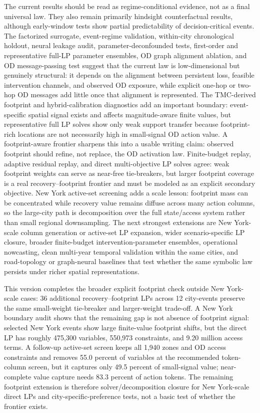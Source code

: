 The current results should be read as regime-conditional evidence, not as a final universal law. They also remain primarily hindsight counterfactual results, although early-window tests show partial predictability of decision-critical events. The factorized surrogate, event-regime validation, within-city chronological holdout, neural leakage audit, parameter-deconfounded tests, first-order and representative full-LP parameter ensembles, OD graph alignment ablation, and OD message-passing test suggest that the current law is low-dimensional but genuinely structural: it depends on the alignment between persistent loss, feasible intervention channels, and observed OD exposure, while explicit one-hop or two-hop OD messages add little once that alignment is represented. The TMC-derived footprint and hybrid-calibration diagnostics add an important boundary: event-specific spatial signal exists and affects magnitude-aware finite values, but representative full LP solves show only weak support transfer because footprint-rich locations are not necessarily high in small-signal OD action value. A footprint-aware frontier sharpens this into a usable writing claim: observed footprint should refine, not replace, the OD activation law. Finite-budget replay, adaptive residual replay, and direct multi-objective LP solves agree: weak footprint weights can serve as near-free tie-breakers, but larger footprint coverage is a real recovery--footprint frontier and must be modeled as an explicit secondary objective. New York active-set screening adds a scale lesson: footprint mass can be concentrated while recovery value remains diffuse across many action columns, so the large-city path is decomposition over the full state/access system rather than small regional downsampling. The next strongest extensions are New York-scale column generation or active-set LP expansion, wider scenario-specific LP closure, broader finite-budget intervention-parameter ensembles, operational nowcasting, clean multi-year temporal validation within the same cities, and road-topology or graph-neural baselines that test whether the same symbolic law persists under richer spatial representations.

This version completes the broader explicit footprint check outside New York-scale cases: 36 additional recovery--footprint LPs across 12 city-events preserve the same small-weight tie-breaker and larger-weight trade-off. A New York boundary audit shows that the remaining gap is not absence of footprint signal: selected New York events show large finite-value footprint shifts, but the direct LP has roughly 475,300 variables, 550,973 constraints, and 9.20 million access terms. A follow-up active-set screen keeps all 1,940 zones and OD access constraints and removes 55.0 percent of variables at the recommended token-column screen, but it captures only 49.5 percent of small-signal value; near-complete value capture needs 83.3 percent of action tokens. The remaining footprint extension is therefore solver/decomposition closure for New York-scale direct LPs and city-specific-preference tests, not a basic test of whether the frontier exists.
